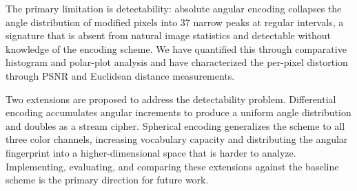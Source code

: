\documentclass[12pt]{article}
\begin{document}
The primary limitation is detectability: absolute angular encoding collapses
the angle distribution of modified pixels into 37 narrow peaks at regular
intervals, a signature that is absent from natural image statistics and
detectable without knowledge of the encoding scheme. We have quantified this
through comparative histogram and polar-plot analysis and have characterized
the per-pixel distortion through PSNR and Euclidean distance measurements.

Two extensions are proposed to address the detectability problem. Differential
encoding accumulates angular increments to produce a uniform angle
distribution and doubles as a stream cipher. Spherical encoding generalizes
the scheme to all three color channels, increasing vocabulary capacity and
distributing the angular fingerprint into a higher-dimensional space that is
harder to analyze. Implementing, evaluating, and comparing these extensions
against the baseline scheme is the primary direction for future work.



\end{document}
